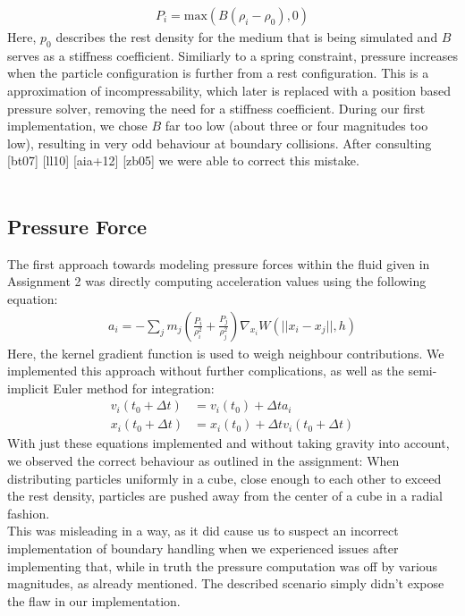 \documentclass{ACGSeminar}
\begin{document}
\begin{equation} 
\begin{aligned}
P_i = \text{max}(B(\rho_i - \rho_0),0)
\end{aligned}
\end{equation}
Here, \(p_0\) describes the rest density for the medium that is being simulated and \(B\) serves as a stiffness coefficient. Similiarly to a spring constraint, pressure increases when the particle configuration is further from a rest configuration. This is a approximation of incompressability, which later is replaced with a position based pressure solver, removing the need for a stiffness coefficient.
During our first implementation, we chose \(B\) far too low (about three or four magnitudes too low), resulting in very odd behaviour at boundary collisions. After consulting [bt07] [ll10] [aia+12] [zb05] we were able to correct this mistake.\\
\\
\subsection{Pressure Force}
The first approach towards modeling pressure forces within the fluid given in Assignment 2 was directly computing acceleration values using the following equation:\\
\begin{equation} 
\begin{aligned}
a_{i} = - \sum_{j} m_{j}(\frac{P_{i}}{\rho_{i}^{2}} + \frac{P_{j}}{\rho_{j}^{2}})\nabla_{x_{i}}W(||x_{i} -
 x_{j}||, h)
\end{aligned}
\end{equation}
Here, the kernel gradient function is used to weigh neighbour contributions. 
We implemented this approach without further complications, as well as the semi-implicit Euler method for integration:
\begin{equation} 
\begin{aligned}
v_{i}(t_0 + \Delta t) &= v_i(t_0) + \Delta t  a_i \\
x_i(t_0 + \Delta t) &= x_i(t_0) + \Delta t v_i(t_0 + \Delta t)
\end{aligned}
\end{equation}
With just these equations implemented and without taking gravity into account, we observed the correct behaviour as outlined in the assignment: When distributing particles uniformly in a cube, close enough to each other to exceed the rest density, particles are pushed away from the center of a cube in a radial fashion.\\
This was misleading in a way, as it did cause us to suspect an incorrect implementation of boundary handling when we experienced issues after implementing that, while in truth the pressure computation was off by various magnitudes, as already mentioned. The described scenario simply didn't expose the flaw in our implementation.
\end{document}
